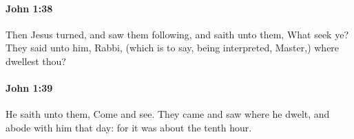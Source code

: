 		\paragraph{John 1:38} %
			\label{JOHN-1-38}

			Then Jesus turned, and saw them following, and saith unto them, What seek ye? They said unto him, Rabbi, (which is to say, being interpreted, Master,) where dwellest thou?

			\begin{framed}
			\scriptsize
				\begin{compactdesc}
					\item[SBLG] 
				\end{compactdesc}
			\end{framed}

		\paragraph{John 1:39} %
			\label{JOHN-1-39}

			He saith unto them, Come and see. They came and saw where he dwelt, and abode with him that day: for it was about the tenth hour.

